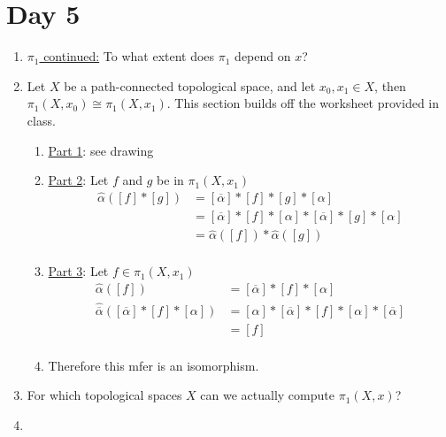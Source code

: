 \section{Day 5}
    \begin{enumerate}
        \item \underline{$\pi_1$ continued:} To what extent does $\pi_1$ depend on $x$?
        \item 
            \begin{theorem} Let $X$ be a path-connected topological space, and let $x_0,x_1\in X$, then
            $\pi_1(X,x_0)\cong\pi_1(X,x_1)$. This section builds off the worksheet provided in class.
            \begin{enumerate}
                \item \underline{Part 1}: see drawing
                \item \underline{Part 2}: Let $f$ and $g$ be in $\pi_1(X,x_1)$
                    \begin{align*}
                        \hat{\alpha}([f]*[g])
                        &=[\overline{\alpha}] *[f]*[g] *[\alpha]\\
                        &=[\overline{\alpha}] *[f] *[\alpha] *[\overline{\alpha}] *[g] *[\alpha]\\
                        &=\hat{\alpha}([f])*\hat{\alpha}([g])\\
                    \end{align*}
                \item \underline{Part 3}: Let $f \in \pi_1(X,x_1)$
                    \begin{align*}
                        \hat{\alpha}([f])
                        &=[\overline{\alpha}] *[f] *[\alpha]\\
                        \hat{\overline{\alpha}}( [\overline{\alpha}] *[f] *[\alpha])
                        &=[\alpha] *[\overline{\alpha}] *[f] *[\alpha] *[\overline{\alpha}]\\
                        &=[f]\\
                    \end{align*}
                \item Therefore this mfer is an isomorphism.
            \end{enumerate}
            \end{theorem}
        \item For which topological spaces $X$ can we actually compute $\pi_1(X,x)$?
        \item 

\end{enumerate}
